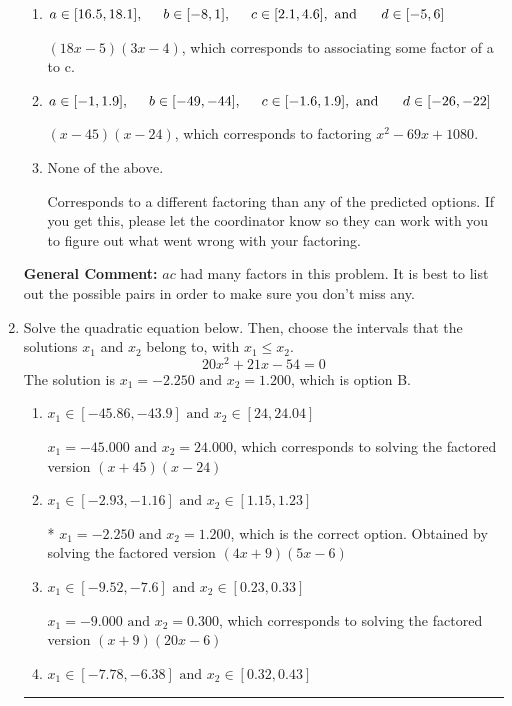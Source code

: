 \documentclass{extbook}[14pt]
\newcommand{\litem}[1]{\item #1

\rule{\textwidth}{0.4pt}}
\begin{document}
\begin{enumerate}
{\begin{enumerate}[label=\Alph*.]
* $(6x -5)(9x -4)$, which is the correct option.
\item \( a \in [16.5, 18.1], \hspace*{5mm} b \in [-8, 1], \hspace*{5mm} c \in [2.1, 4.6], \text{ and } \hspace*{5mm} d \in [-5, 6] \)

 $(18x -5)(3x -4)$, which corresponds to associating some factor of a to c.
\item \( a \in [-1, 1.9], \hspace*{5mm} b \in [-49, -44], \hspace*{5mm} c \in [-1.6, 1.9], \text{ and } \hspace*{5mm} d \in [-26, -22] \)

 $(x -45)(x -24)$, which corresponds to factoring $x^{2} -69 x + 1080$.
\item \( \text{None of the above.} \)

 Corresponds to a different factoring than any of the predicted options. If you get this, please let the coordinator know so they can work with you to figure out what went wrong with your factoring.
\end{enumerate}

\textbf{General Comment:} $ac$ had many factors in this problem. It is best to list out the possible pairs in order to make sure you don't miss any.
}
\litem{
Solve the quadratic equation below. Then, choose the intervals that the solutions $x_1$ and $x_2$ belong to, with $x_1 \leq x_2$.
\[ 20x^{2} +21 x -54 = 0 \]The solution is \( x_1 = -2.250 \text{ and } x_2 = 1.200 \), which is option B.\begin{enumerate}[label=\Alph*.]
\item \( x_1 \in [-45.86, -43.9] \text{ and } x_2 \in [24, 24.04] \)

$x_1 = -45.000 \text{ and } x_2 = 24.000$, which corresponds to solving the factored version $(x + 45)(x -24)$
\item \( x_1 \in [-2.93, -1.16] \text{ and } x_2 \in [1.15, 1.23] \)

* $x_1 = -2.250 \text{ and } x_2 = 1.200$, which is the correct option. Obtained by solving the factored version $(4x + 9)(5x -6)$
\item \( x_1 \in [-9.52, -7.6] \text{ and } x_2 \in [0.23, 0.33] \)

$x_1 = -9.000 \text{ and } x_2 = 0.300$, which corresponds to solving the factored version $(x + 9)(20x -6)$
\item \( x_1 \in [-7.78, -6.38] \text{ and } x_2 \in [0.32, 0.43] \)


\end{enumerate}}
\end{enumerate}
\end{document}
